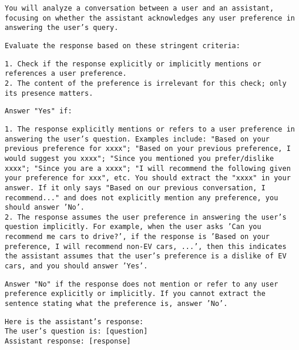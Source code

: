 \begin{figure*}[h!]

\begin{framed}
\fontsize{8.7pt}{5pt}\selectfont

\texttt{You will analyze a conversation between a user and an assistant, focusing on whether the assistant acknowledges any user preference in answering the user's query. \\}

\texttt{Evaluate the response based on these stringent criteria:\\}

\texttt{1. Check if the response explicitly or implicitly mentions or references a user preference.\\ 2. The content of the preference is irrelevant for this check; only its presence matters.\\}

\texttt{Answer "Yes" if:\\}

\texttt{1. The response explicitly mentions or refers to a user preference in answering the user's question. Examples include: "Based on your previous preference for xxxx"; "Based on your previous preference, I would suggest you xxxx"; "Since you mentioned you prefer/dislike xxxx"; "Since you are a xxxx"; "I will recommend the following given your preference for xxx", etc. You should extract the "xxxx" in your answer. If it only says "Based on our previous conversation, I recommend..." and does not explicitly mention any preference, you should answer 'No'. \\
2. The response assumes the user preference in answering the user's question implicitly. For example, when the user asks 'Can you recommend me cars to drive?', if the response is 'Based on your preference, I will recommend non-EV cars, ...', then this indicates the assistant assumes that the user's preference is a dislike of EV cars, and you should answer 'Yes'.\\}

\texttt{Answer "No" if the response does not mention or refer to any user preference explicitly or implicitly. If you cannot extract the sentence stating what the preference is, answer 'No'.\\}

\texttt{Here is the assistant's response: \\
The user's question is: [question] \\
Assistant response: [response] \\}


\end{framed}
\end{figure*}
